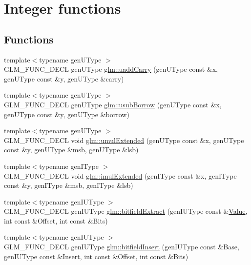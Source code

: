 \hypertarget{group__core__func__integer}{}\section{Integer functions}
\label{group__core__func__integer}
\subsection*{Functions}
\begin{DoxyCompactItemize}
\item 
{\footnotesize template$<$typename gen\+U\+Type $>$ }\\G\+L\+M\+\_\+\+F\+U\+N\+C\+\_\+\+D\+E\+CL gen\+U\+Type \hyperlink{group__core__func__integer_ga19276bb7adbe9f0d74515ae49e40b481}{glm\+::uadd\+Carry} (gen\+U\+Type const \&x, gen\+U\+Type const \&y, gen\+U\+Type \&carry)
\item 
{\footnotesize template$<$typename gen\+U\+Type $>$ }\\G\+L\+M\+\_\+\+F\+U\+N\+C\+\_\+\+D\+E\+CL gen\+U\+Type \hyperlink{group__core__func__integer_gae5b4a6cefd1e21fd2e1b8526b4c964a7}{glm\+::usub\+Borrow} (gen\+U\+Type const \&x, gen\+U\+Type const \&y, gen\+U\+Type \&borrow)
\item 
{\footnotesize template$<$typename gen\+U\+Type $>$ }\\G\+L\+M\+\_\+\+F\+U\+N\+C\+\_\+\+D\+E\+CL void \hyperlink{group__core__func__integer_gad991bf53779a4309a920bb7bfcf2639c}{glm\+::umul\+Extended} (gen\+U\+Type const \&x, gen\+U\+Type const \&y, gen\+U\+Type \&msb, gen\+U\+Type \&lsb)
\item 
{\footnotesize template$<$typename gen\+I\+Type $>$ }\\G\+L\+M\+\_\+\+F\+U\+N\+C\+\_\+\+D\+E\+CL void \hyperlink{group__core__func__integer_ga7d284e3ea5059cae9fe8f0fe1a76dd02}{glm\+::imul\+Extended} (gen\+I\+Type const \&x, gen\+I\+Type const \&y, gen\+I\+Type \&msb, gen\+I\+Type \&lsb)
\item 
{\footnotesize template$<$typename gen\+I\+U\+Type $>$ }\\G\+L\+M\+\_\+\+F\+U\+N\+C\+\_\+\+D\+E\+CL gen\+I\+U\+Type \hyperlink{group__core__func__integer_ga251d309beb171bf95117d2c301b2ad8b}{glm\+::bitfield\+Extract} (gen\+I\+U\+Type const \&\hyperlink{document_8h_a071cf97155ba72ac9a1fc4ad7e63d481}{Value}, int const \&Offset, int const \&Bits)
\item 
{\footnotesize template$<$typename gen\+I\+U\+Type $>$ }\\G\+L\+M\+\_\+\+F\+U\+N\+C\+\_\+\+D\+E\+CL gen\+I\+U\+Type \hyperlink{group__core__func__integer_ga7ab09972d52094d97d2480982e657dd0}{glm\+::bitfield\+Insert} (gen\+I\+U\+Type const \&Base, gen\+I\+U\+Type const \&Insert, int const \&Offset, int const \&Bits)

\end{DoxyCompactItemize}
